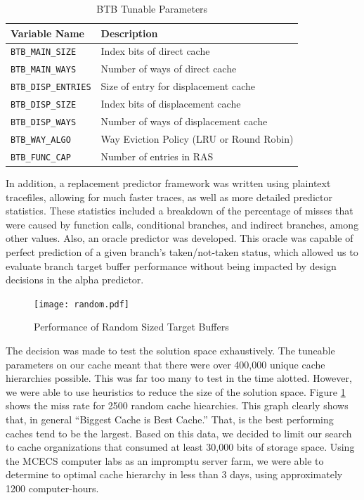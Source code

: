 \documentclass[twocolumn]{article}
\newcommand{\centerimage}[3]{
\begin{figure}[ht!]  
\begin{center} #1
\caption{#2}
\label{#3}
\end{center}
\end{figure}}
\begin{document}
\begin{table}
\begin{center}\begin{tabular}{p{}p{}}
Variable Name & Description \\
\hline
\texttt{BTB\_MAIN\_SIZE} & Index bits of direct cache \\
\texttt{BTB\_MAIN\_WAYS} & Number of ways of direct cache \\
\texttt{BTB\_DISP\_ENTRIES} & Size of entry for displacement cache \\
\texttt{BTB\_DISP\_SIZE} & Index bits of displacement cache \\
\texttt{BTB\_DISP\_WAYS} & Number of ways of displacement cache \\
\texttt{BTB\_WAY\_ALGO} & Way Eviction Policy (LRU or Round Robin) \\
\texttt{BTB\_FUNC\_CAP} & Number of entries in RAS
\end{tabular}\end{center}
\caption{BTB Tunable Parameters}
\label{envars}
\end{table}

In addition, a replacement predictor framework was written using
plaintext tracefiles, allowing for much faster traces, as well as more
detailed predictor statistics. These statistics included a breakdown
of the percentage of misses that were caused by function calls,
conditional branches, and indirect branches, among other values. Also,
an oracle predictor was developed. This oracle was capable of perfect
prediction of a given branch's taken/not-taken status, which allowed
us to evaluate branch target buffer performance without being impacted
by design decisions in the alpha predictor.

\centerimage{\texttt{[image: random.pdf]}}{Performance
  of Random Sized Target Buffers}{bgraph}

The decision was made to test the solution space exhaustively. The
tuneable parameters on our cache meant that there were over 400,000
unique cache hierarchies possible. This was far too many to test in
the time alotted. However, we were able to use heuristics to reduce
the size of the solution space. Figure \ref{bgraph} shows the miss
rate for 2500 random cache hiearchies. This graph clearly shows that,
in general ``Biggest Cache is Best Cache.'' That, is the best
performing caches tend to be the largest. Based on this data, we
decided to limit our search to cache organizations that consumed at
least 30,000 bits of storage space. Using the MCECS computer labs as
an impromptu server farm, we were able to determine to optimal cache
hierarchy in less than 3 days, using approximately 1200
computer-hours. 
\end{document}
